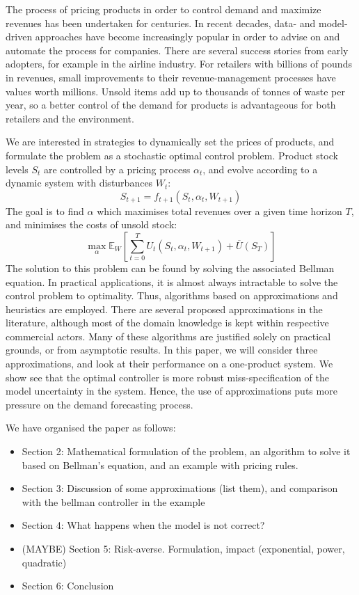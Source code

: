 \documentclass[main.tex]{subfiles}
\begin{document}
The process of pricing products in order to control demand and
maximize revenues has been undertaken for centuries. In recent
decades, data- and model-driven approaches have become increasingly
popular in order to advise on and automate the process for companies.
There are several success stories from early adopters, for example in
the airline industry.
For retailers with billions of pounds in revenues, small
improvements to their revenue-management processes have values worth millions.
Unsold items add up to thousands of tonnes of waste per year, so
a better control of the demand for products is advantageous
for both retailers and the environment.

We are interested in strategies to dynamically set the prices of products, and
formulate the problem as a stochastic optimal control problem.
Product stock levels $S_t$ are controlled by a pricing process
$\alpha_t$, and evolve according to a dynamic system with disturbances
$W_t$:
\begin{equation}
S_{t+1}=f_{t+1}(S_t,\alpha_t,W_{t+1})
\end{equation}
The goal is to find $\alpha$ which maximises total revenues over a
given time horizon $T$, and
minimises the costs of unsold stock:
\begin{equation}
  \max_{\alpha}\mathbb E_W\left[ \sum_{t=0}^TU_t(S_t,\alpha_t,W_{t+1})
  + \overline{U}(S_T)\right]
\end{equation}
The solution to this problem can be found by solving the associated
Bellman equation. In practical applications, it is almost always
intractable to solve the control problem to optimality.
Thus, algorithms based on approximations and heuristics are employed.
There are several proposed approximations in the
literature, although most of the domain knowledge is kept within
respective commercial actors.
Many of these algorithms are justified solely on practical grounds, or
from asymptotic results.
In this paper, we will consider three approximations,
and look at their performance on a one-product system.
We show see that the optimal controller is more robust
miss-specification of the model uncertainty in the system.
Hence, the use of approximations puts more pressure on the
demand forecasting process.

We have organised the paper as follows:
\begin{itemize}
\item Section 2: Mathematical formulation of the problem, an algorithm
  to solve it based on Bellman's equation, and an example with pricing rules.
\item Section 3: Discussion of some approximations (list them), and
  comparison with the bellman controller in the example
\item Section 4: What happens when the model is not correct?
\item (MAYBE) Section 5: Risk-averse. Formulation, impact
  (exponential, power, quadratic)
\item Section 6: Conclusion
\end{itemize}


\biblio
\end{document}
